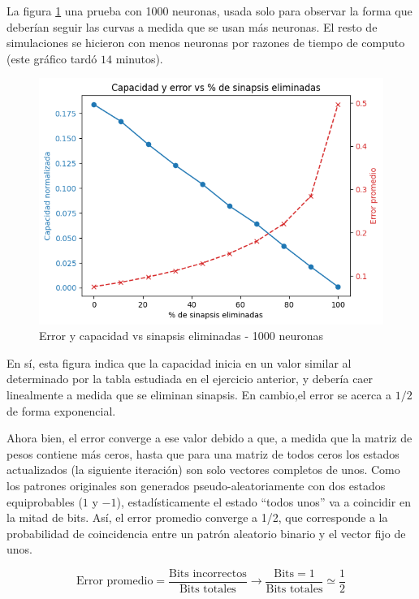 \documentclass[11pt]{article} %
\begin{document}
La figura \ref{fig:1000_neuronas} una prueba con 1000 neuronas, usada solo para observar la forma que deberían seguir las curvas a medida que se usan más neuronas. El resto de simulaciones se hicieron con menos neuronas por razones de tiempo de computo (este gráfico tardó $14$ minutos). 

\begin{figure}[h!]
	\centering
	\includegraphics[width=0.7\linewidth]{imgs/ej_complementario_1000_neuronas}
	\caption{Error y capacidad vs sinapsis eliminadas - 1000 neuronas}
	\label{fig:1000_neuronas}
\end{figure}

En sí, esta figura indica que la capacidad inicia en un valor similar al determinado por la tabla estudiada en el ejercicio anterior, y debería caer linealmente a medida que se eliminan sinapsis. En cambio,el error se acerca a $1/2$ de forma exponencial. 

Ahora bien, el error converge a ese valor debido a que, a medida que la matriz de pesos contiene más ceros, hasta que para una matriz de todos ceros los estados actualizados (la siguiente iteración) son solo vectores completos de unos. Como los patrones originales son generados pseudo-aleatoriamente con dos estados equiprobables ($1$ y $-1$), estadísticamente el estado ``todos unos'' va a coincidir en la mitad de bits. Así, el error promedio converge a 1/2, que corresponde a la probabilidad de coincidencia entre un patrón aleatorio binario y el vector fijo de unos.

$$
\text{Error promedio} = \frac{\text{Bits incorrectos}}{\text{Bits totales}} \rightarrow 
 \frac{\text{Bits}=1}{\text{Bits totales}} \simeq \frac{1}{2}
$$ 
\end{document}
